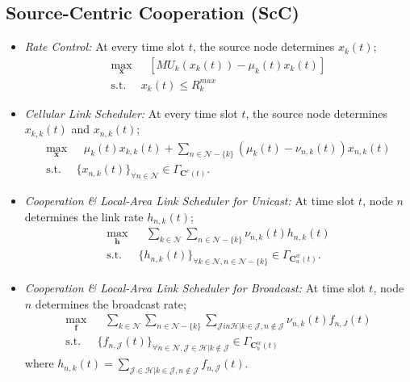 \documentclass[conference]{IEEEtran}
\newcommand{\Jset}{\mathcal{J}}
\newcommand{\Nset}{\mathcal{N}}
\newcommand{\Hset}{\mathcal{H}}
\begin{document}
\subsection{Source-Centric Cooperation (ScC)}
\vspace{-5pt}
\begin{itemize}
 \item {\em Rate Control:} At every time slot $t$, the source node determines ${x}_k(t)$;
\begin{align} \label{eq:ScCrate_control}
\max_{\boldsymbol {{x}}} & \mbox{  }  [M U_{k}({x}_k(t)) -  {\mu}_{k}(t) {x}_{k}(t) ] \nonumber \\
\mbox{s.t. } &  {x}_k(t) \leq R_{k}^{max}
\end{align}
 \item {\em Cellular Link Scheduler:} At every time slot $t$, the source node determines ${x}_{k,k}(t)$ and ${x}_{n,k}(t)$;
\begin{align} \label{eq:ScCcellular_scheduling}
\max_{\boldsymbol {{x}}} & \mbox{  }   {\mu}_{k}(t) {x}_{k,k}(t) +  \sum_{n \in \Nset-\{k\}} ({\mu}_{k}(t) - {\nu}_{n,k}(t)){x}_{n,k}(t) \nonumber \\
  \mbox{s.t. } & \{{x}_{n,k}(t)\}_{\forall n \in \Nset} \in \Gamma_{\boldsymbol C^c(t)}.
  \end{align}
 \item {\em Cooperation \& Local-Area Link Scheduler for Unicast:} At time slot $t$, node $n$ determines the link rate ${h}_{n,k}(t)$;
\begin{align} \label{eq:ScClocal_area_scheduling_unicast}
 \max_{\boldsymbol {{h}}} & \mbox{  }  \sum_{k \in \Nset} \sum_{n \in \Nset-\{k\}} {\nu}_{n,k}(t) {h}_{n,k}(t)   \nonumber \\
\mbox{s.t.} \mbox{ }  & \{{h}_{n,k}(t)\}_{\forall k \in \Nset, n \in \Nset -\{k\}} \in \Gamma_{\boldsymbol C_{u}^{w}(t)}.
\end{align}
 \item {\em Cooperation \& Local-Area Link Scheduler for Broadcast:}
At time slot $t$, node $n$ determines the broadcast rate;
\begin{align} \label{eq:ScClocal_area_scheduling_broadcast}
 \max_{\boldsymbol {{f}}} & \mbox{  }  \sum_{k \in \Nset} \sum_{n \in \Nset-\{k\}} \sum_{\Jset in \Hset | k \in \Jset, n \notin \Jset}  {\nu}_{n,k}(t) {f}_{n,J}(t)   \nonumber \\
\mbox{s.t.} \mbox{ }  & \{{f}_{n,\Jset}(t)\}_{\forall n \in \Nset, \Jset \in \Hset | k \notin \Jset} \in \Gamma_{\boldsymbol C_{b}^{w}(t)}
\end{align} where ${h}_{n,k}(t) = \sum_{\Jset \in \Hset | k \in \Jset, n \notin \Jset} f_{n,\Jset}(t)$.
\end{itemize}
\end{document}
